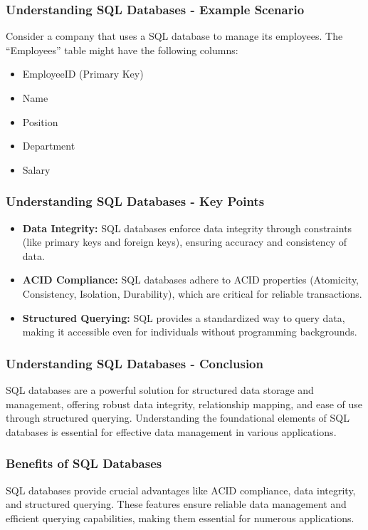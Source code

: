 \documentclass[aspectratio=169]{beamer}
\begin{document}
\begin{frame}[fragile]
    \frametitle{Understanding SQL Databases - Example Scenario}
    Consider a company that uses a SQL database to manage its employees. The “Employees” table might have the following columns:
    \begin{itemize}
        \item EmployeeID (Primary Key)
        \item Name
        \item Position
        \item Department
        \item Salary
    \end{itemize}
\end{frame}

\begin{frame}[fragile]
    \frametitle{Understanding SQL Databases - Key Points}
    \begin{itemize}
        \item \textbf{Data Integrity:} SQL databases enforce data integrity through constraints (like primary keys and foreign keys), ensuring accuracy and consistency of data.
        \item \textbf{ACID Compliance:} SQL databases adhere to ACID properties (Atomicity, Consistency, Isolation, Durability), which are critical for reliable transactions.
        \item \textbf{Structured Querying:} SQL provides a standardized way to query data, making it accessible even for individuals without programming backgrounds.
    \end{itemize}
\end{frame}

\begin{frame}[fragile]
    \frametitle{Understanding SQL Databases - Conclusion}
    SQL databases are a powerful solution for structured data storage and management, offering robust data integrity, relationship mapping, and ease of use through structured querying. Understanding the foundational elements of SQL databases is essential for effective data management in various applications.
\end{frame}

\begin{frame}[fragile]
    \frametitle{Benefits of SQL Databases}
    SQL databases provide crucial advantages like ACID compliance, data integrity, and structured querying. These features ensure reliable data management and efficient querying capabilities, making them essential for numerous applications.
\end{frame}
\end{document}
